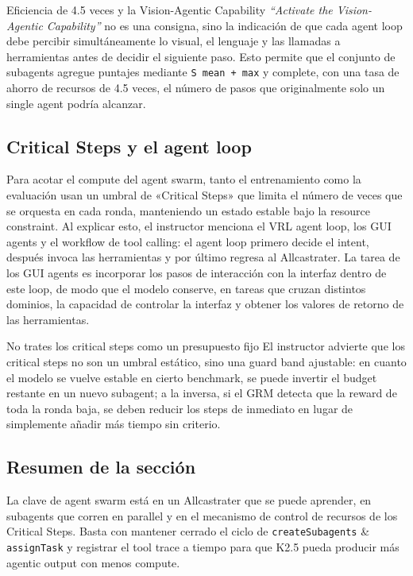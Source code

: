 \begin{importantbox}{Eficiencia de 4.5 veces y la Vision-Agentic Capability}
\textit{``Activate the Vision-Agentic Capability''} no es una consigna, sino la indicación de que cada agent loop debe percibir simultáneamente lo visual, el lenguaje y las llamadas a herramientas antes de decidir el siguiente paso. Esto permite que el conjunto de subagents agregue puntajes mediante \texttt{S mean + max} y complete, con una tasa de ahorro de recursos de 4.5 veces, el número de pasos que originalmente solo un single agent podría alcanzar.
\end{importantbox}

\subsection{Critical Steps y el agent loop}
Para acotar el compute del agent swarm, tanto el entrenamiento como la evaluación usan un umbral de «Critical Steps» que limita el número de veces que se orquesta en cada ronda, manteniendo un estado estable bajo la resource constraint. Al explicar esto, el instructor menciona el VRL agent loop, los GUI agents y el workflow de tool calling: el agent loop primero decide el intent, después invoca las herramientas y por último regresa al Allcastrater. La tarea de los GUI agents es incorporar los pasos de interacción con la interfaz dentro de este loop, de modo que el modelo conserve, en tareas que cruzan distintos dominios, la capacidad de controlar la interfaz y obtener los valores de retorno de las herramientas.

\begin{warningbox}{No trates los critical steps como un presupuesto fijo}
El instructor advierte que los critical steps no son un umbral estático, sino una guard band ajustable: en cuanto el modelo se vuelve estable en cierto benchmark, se puede invertir el budget restante en un nuevo subagent; a la inversa, si el GRM detecta que la reward de toda la ronda baja, se deben reducir los steps de inmediato en lugar de simplemente añadir más tiempo sin criterio.
\end{warningbox}

\subsection{Resumen de la sección}
La clave de agent swarm está en un Allcastrater que se puede aprender, en subagents que corren en parallel y en el mecanismo de control de recursos de los Critical Steps. Basta con mantener cerrado el ciclo de \texttt{createSubagents} \& \texttt{assignTask} y registrar el tool trace a tiempo para que K2.5 pueda producir más agentic output con menos compute.

